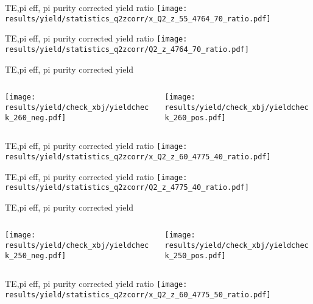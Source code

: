 \begin{frame}{TE,pi eff, pi purity corrected yield ratio}
\texttt{[image: results/yield/statistics\_q2zcorr/x\_Q2\_z\_55\_4764\_70\_ratio.pdf]}
\end{frame}
\begin{frame}{TE,pi eff, pi purity corrected yield ratio}
\texttt{[image: results/yield/statistics\_q2zcorr/Q2\_z\_4764\_70\_ratio.pdf]}
\end{frame}
\begin{frame}{TE,pi eff, pi purity corrected yield}
\begin{columns}
\begin{column}[T]{0.5\textwidth}
\texttt{[image: results/yield/check\_xbj/yieldcheck\_260\_neg.pdf]}
\end{column}
\begin{column}[T]{0.5\textwidth}
\texttt{[image: results/yield/check\_xbj/yieldcheck\_260\_pos.pdf]}
\end{column}
\end{columns}
\end{frame}
\begin{frame}{TE,pi eff, pi purity corrected yield ratio}
\texttt{[image: results/yield/statistics\_q2zcorr/x\_Q2\_z\_60\_4775\_40\_ratio.pdf]}
\end{frame}
\begin{frame}{TE,pi eff, pi purity corrected yield ratio}
\texttt{[image: results/yield/statistics\_q2zcorr/Q2\_z\_4775\_40\_ratio.pdf]}
\end{frame}
\begin{frame}{TE,pi eff, pi purity corrected yield}
\begin{columns}
\begin{column}[T]{0.5\textwidth}
\texttt{[image: results/yield/check\_xbj/yieldcheck\_250\_neg.pdf]}
\end{column}
\begin{column}[T]{0.5\textwidth}
\texttt{[image: results/yield/check\_xbj/yieldcheck\_250\_pos.pdf]}
\end{column}
\end{columns}
\end{frame}
\begin{frame}{TE,pi eff, pi purity corrected yield ratio}
\texttt{[image: results/yield/statistics\_q2zcorr/x\_Q2\_z\_60\_4775\_50\_ratio.pdf]}
\end{frame}

